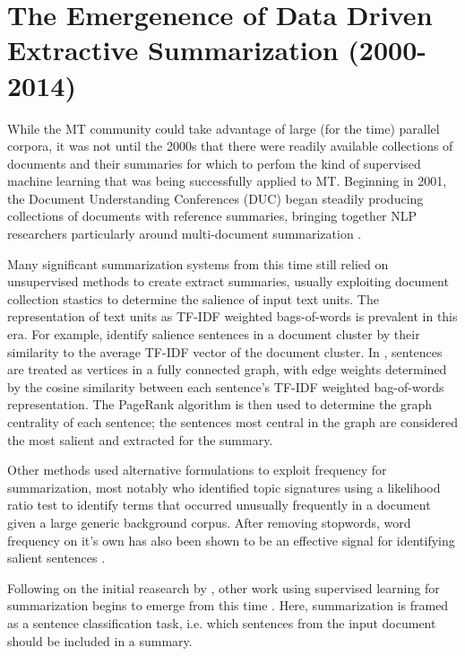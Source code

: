 \section{The Emergenence of Data Driven Extractive Summarization (2000-2014)}

While the MT community could
take advantage of large (for the time) parallel corpora,  it was not until the
2000s that there were readily available collections of documents and their
summaries for which to perfom the kind of supervised machine learning that was
being successfully applied to MT. Beginning in 2001, the Document
Understanding Conferences (DUC) began steadily producing collections of
documents with reference summaries, bringing together NLP researchers
particularly around multi-document summarization \citep{nenkova2005b}.
  
Many significant summarization systems from this time still relied on
unsupervised methods to create extract summaries, usually exploiting document
collection stastics to determine the salience of input text units.
The representation of text units as TF-IDF weighted bags-of-words
\citep{jones1972} is prevalent in this era. For example, \cite{radev2000}
identify salience sentences in a document cluster by their similarity to the
average TF-IDF vector of the document cluster. In \cite{erkan2004}, sentences
are treated as vertices in a fully connected graph, with edge weights
determined by the cosine similarity between each sentence's TF-IDF weighted
bag-of-words representation. The PageRank algorithm \citep{page1999} is then
used to determine the graph centrality of each sentence; the sentences most
central in the graph are considered the most salient and extracted for the
summary. 

Other methods used alternative formulations to exploit frequency for summarization, most notably \cite{lin2000} who identified topic signatures using
a likelihood ratio test \citep{dunning1993} to identify terms that occurred unusually
frequently in a document given a large generic background corpus. After 
removing stopwords, word frequency on it's own has also been shown to be
an effective signal for identifying salient sentences \citep{nenkova2005}.

Following on the initial reasearch by \cite{kupiec1995trainable}, other work 
using supervised learning for summarization begins to emerge from this time
\citep{conroy2001using,osborne2002using,hirao2002extracting,sipos2012large}.
Here, summarization is framed as a sentence
classification task, i.e. which sentences from the input document should be
included in a summary. 

